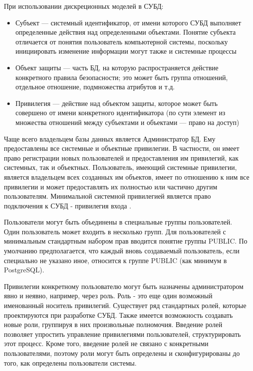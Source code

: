При использовании дискреционных моделей в СУБД:
\begin{itemize}
    \item Субъект --- системный идентификатор, от имени которого СУБД выполняет определенные действия над
    определенными объектами. Понятие субъекта отличается от понятия пользователь компьютерной системы,
    поскольку инициировать изменение информации могут также и системные процессы
    \item Объект защиты --- часть БД, на которую распространяется действие конкретного правила безопасности;
    это может быть группа отношений, отдельное отношение, подмножества атрибутов и т.д.
    \item Привилегия --- действие над объектом защиты, которое может быть совершено от имени конкретного
    идентификатора (по сути элемент из множества отношений между субъектами и объектами --- право на доступ)
\end{itemize}

Чаще всего владельцем базы данных является Администратор БД. Ему предоставлены все системные и объектные
привилегии. В частности, он имеет право регистрации новых пользователей и предоставления им привилегий, как
системных, так и объектных. Пользователь, имеющий системные привилегии, является владельцем всех созданных им
объектов, имеет по отношению к ним все привилегии и может предоставлять их полностью или частично другим
пользователям. Минимальной системной привилегией является право подключения к СУБД - привилегия входа
\autocite{Skakun}.

Пользователи могут быть объединены в специальные группы пользователей. Один пользователь может входить в
несколько групп. Для пользователей с минимальным стандартным набором прав вводится понятие группы PUBLIC.
По умолчанию предполагается, что каждый вновь создаваемый пользователь, если специально не указано иное,
относится к группе PUBLIC (как минимум в PostgreSQL).

Привилегии конкретному пользователю могут быть назначены администратором явно и неявно, например, через роль.
Роль - это еще один возможный именованный носитель привилегий. Существует ряд стандартных ролей, которые
проектируются при разработке СУБД. Также имеется возможность создавать новые роли, группируя в них произвольные
полномочия. Введение ролей позволяет упростить управление привилегиями пользователей, структурировать этот
процесс. Кроме того, введение ролей не связано с конкретными пользователями, поэтому роли могут быть определены
и сконфигурированы до того, как определены пользователи системы.

